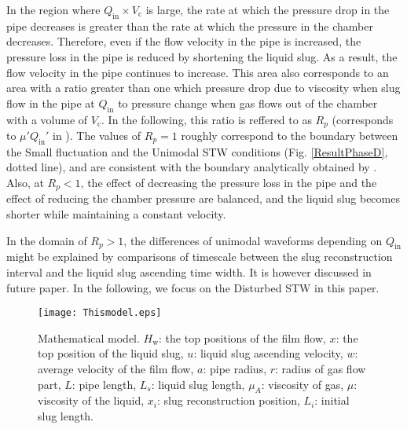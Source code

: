 \documentclass[aps,pre,preprint,groupedaddress,showkeys]{revtex4-2}
\begin{document}
In the region where $ Q_ \mathrm{in} \times V_ \mathrm {c} $ is large, the rate at which the pressure drop in the pipe decreases is greater than the rate at which the pressure in the chamber decreases.
Therefore, even if the flow velocity in the pipe is increased, the pressure loss in the pipe is reduced by shortening the liquid slug.
As a result, the flow velocity in the pipe continues to increase.
This area also corresponds to an area with a ratio greater than one which pressure drop due to viscosity when slug flow in the pipe at $Q_ \mathrm {in}$ to pressure change when gas flows out of the chamber with a volume of $V_\mathrm {c}$.
In the following, this ratio is reffered to as $R_p$ (corresponds to $ \mu' Q_ \mathrm{in} '$ in \cite{kanno2018}).
The values of $ R_p = 1 $ roughly correspond to the boundary between the Small fluctuation and the Unimodal STW conditions (Fig. \ref{ResultPhaseD}, dotted line), and are consistent with the boundary analytically obtained by \cite {kanno2018}.
Also, at $ R_p <1 $, the effect of decreasing the pressure loss in the pipe and the effect of reducing the chamber pressure are balanced, and the liquid slug becomes shorter while maintaining a constant velocity.

In the domain of $ R_p> 1 $, the differences of unimodal waveforms depending on $Q_ \mathrm{in}$ might be explained by comparisons of timescale between the slug reconstruction interval and the liquid slug ascending time width. It is however discussed in future paper.
In the following, we focus on the Disturbed STW in this paper.

\begin{figure}
\texttt{[image: Thismodel.eps]} 
\caption{\label{Thismodel}Mathematical model. $H_\mathrm{w}$: the top positions of the film flow, $x$: the top position of the liquid slug, $u$: liquid slug ascending velocity, $w$: average velocity of the film flow, $a$: pipe radius, $r$: radius of gas flow part, $L$: pipe length, $L_s$: liquid slug length, $\mu_A$: viscosity of gas, $\mu$: viscosity of the liquid, $x_i$: slug reconstruction position, $L_i$: initial slug length.}
\end{figure}
\end{document}
